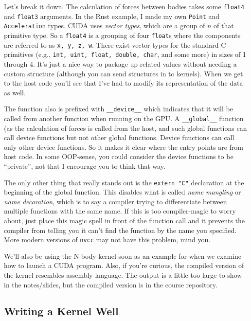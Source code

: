 \documentclass[a4paper]{report}
\begin{document}
Let's break it down. The calculation of forces between bodies takes some \texttt{float4} and \texttt{float3} arguments. In the Rust example, I made my own \texttt{Point} and \texttt{Acceleration} types. CUDA uses \textit{vector types}, which are a group of $n$ of that primitive type. So a \texttt{float4} is a grouping of four \texttt{float}s where the components are referred to as \texttt{x, y, z, w}. There exist vector types for the standard C primitives (e.g., \texttt{int, uint, float, double, char}, and some more) in sizes of 1 through 4. It's just a nice way to package up related values without needing a custom structure (although you can send structures in to kernels). When we get to the host code you'll see that I've had to modify its representation of the data as well.

The function also is prefixed with \texttt{\_\_device\_\_} which indicates that it will be called from another function when running on the GPU. A \texttt{\_\_global\_\_} function (as the calculation of forces is called from the host, and such global functions can call device functions but not other global functions. Device functions can call only other device functions. So it makes it clear where the entry points are from host code. In some OOP-sense, you could consider the device functions to be ``private'', not that I encourage you to think that way.

The only other thing that really stands out is the \texttt{extern "C"} declaration at the beginning of the global function. This disables what is called \textit{name mangling} or \textit{name decoration}, which is to say a compiler trying to differentiate between multiple functions with the same name. If this is too compiler-magic to worry about, just place this magic spell in front of the function call and it prevents the compiler from telling you it can't find the function by the name you specified. More modern versions of \texttt{nvcc} may not have this problem, mind you.

We'll also be using the N-body kernel soon as an example for when we examine how to launch a CUDA program. Also, if you're curious, the compiled version of the kernel resembles assembly language. The output is a little too large to show in the notes/slides, but the compiled version is in the course repository.

\subsection*{Writing a Kernel Well}
\end{document}
